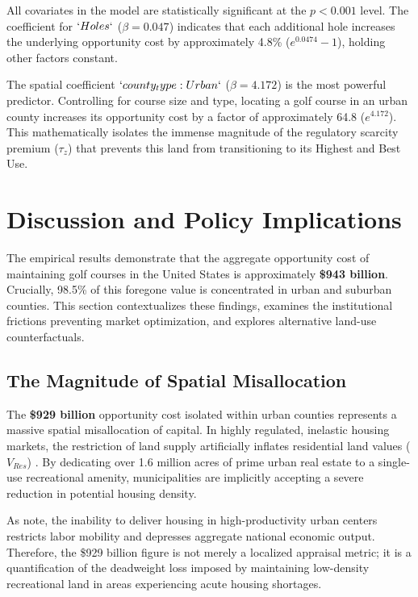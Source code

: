 \documentclass[10pt, letterpaper]{article}
\begin{document}
All covariates in the model are statistically significant at the $p < 0.001$ level. The coefficient for $`Holes`$ ($\beta = 0.047$) indicates that each additional hole increases the underlying opportunity cost by approximately 4.8\% ($e^{0.0474} - 1$), holding other factors constant.

The spatial coefficient $`county_type: Urban`$ ($\beta = 4.172$) is the most powerful predictor. Controlling for course size and type, locating a golf course in an urban county increases its opportunity cost by a factor of approximately 64.8 ($e^{4.172}$). This mathematically isolates the immense magnitude of the regulatory scarcity premium ($\tau_z$) that prevents this land from transitioning to its Highest and Best Use.

\newpage

\section{Discussion and Policy Implications}

The empirical results demonstrate that the aggregate opportunity cost of maintaining golf courses in the United States is approximately \textbf{\$943 billion}. Crucially, 98.5\% of this foregone value is concentrated in urban and suburban counties. This section contextualizes these findings, examines the institutional frictions preventing market optimization, and explores alternative land-use counterfactuals.

\subsection{The Magnitude of Spatial Misallocation}
The \textbf{\$929 billion} opportunity cost isolated within urban counties represents a massive spatial misallocation of capital. In highly regulated, inelastic housing markets, the restriction of land supply artificially inflates residential land values ($V_{Res}$) \parencite{Glaeser2005, Davis2021}. By dedicating over 1.6 million acres of prime urban real estate to a single-use recreational amenity, municipalities are implicitly accepting a severe reduction in potential housing density. 

As \textcite{Glaeser2017} note, the inability to deliver housing in high-productivity urban centers restricts labor mobility and depresses aggregate national economic output. Therefore, the \$929 billion figure is not merely a localized appraisal metric; it is a quantification of the deadweight loss imposed by maintaining low-density recreational land in areas experiencing acute housing shortages.
\end{document}
